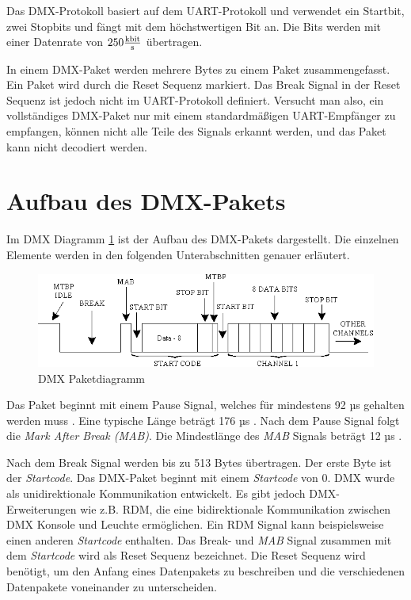 Das DMX-Protokoll basiert auf dem UART-Protokoll und verwendet ein Startbit, zwei Stopbits und fängt mit dem höchstwertigen Bit an. Die Bits werden mit einer Datenrate von $250 \frac{\SI{}{\kilo\bit}}{\SI{}{\s}}$ übertragen.

In einem DMX-Paket werden mehrere Bytes zu einem Paket zusammengefasst. Ein Paket wird durch die Reset Sequenz markiert. Das Break Signal in der Reset Sequenz ist jedoch nicht im UART-Protokoll definiert. Versucht man also, ein vollständiges DMX-Paket nur mit einem standardmäßigen UART-Empfänger zu empfangen, können nicht alle Teile des Signals erkannt werden, und das Paket kann nicht decodiert werden\cite[S.29]{RaspberryPiDmxInterface}.

\section{Aufbau des DMX-Pakets}

Im DMX Diagramm \ref{fig:DmxPacketDiagram} ist der Aufbau des DMX-Pakets dargestellt. Die einzelnen Elemente werden in den folgenden Unterabschnitten genauer erläutert.

\begin{figure}[H]
	\centering
	\includegraphics[width=0.8\linewidth]{Pictures/DmxTiming}
	\caption{DMX Paketdiagramm \cite[S.107]{DmxBiDerectionRdmDMX}}
	\label{fig:DmxPacketDiagram}
\end{figure}

Das Paket beginnt mit einem Pause Signal, welches für mindestens 92 µs gehalten werden muss \cite[S.18]{DMX512-Protocol-Standard}. Eine typische Länge beträgt 176 µs \cite[S.18]{DMX512-Protocol-Standard}. Nach dem Pause Signal folgt die \emph{Mark After Break (MAB)}. Die Mindestlänge des \emph{MAB} Signals beträgt 12 µs \cite[p.18]{DMX512-Protocol-Standard}.

Nach dem Break Signal werden bis zu 513 Bytes übertragen. Der erste Byte ist der \emph{Startcode}. Das DMX-Paket beginnt mit einem \emph{Startcode} von 0. DMX wurde als unidirektionale Kommunikation entwickelt. Es gibt jedoch DMX-Erweiterungen wie z.B. RDM, die eine bidirektionale Kommunikation zwischen DMX Konsole und Leuchte ermöglichen. Ein RDM Signal kann beispielsweise einen anderen \emph{Startcode} enthalten. Das Break- und \emph{MAB} Signal zusammen mit dem \emph{Startcode} wird als Reset Sequenz bezeichnet. Die  Reset Sequenz wird benötigt, um den Anfang eines Datenpakets zu beschreiben und die verschiedenen Datenpakete voneinander zu unterscheiden.

